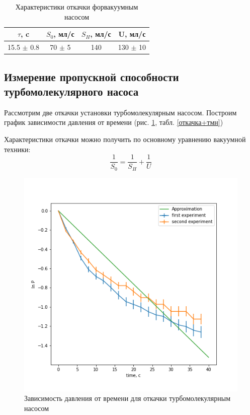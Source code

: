 \documentclass[a4paper,12pt]{article} %
\begin{document}
\begin{table}
\caption{Характеристики откачки форвакуумным насосом}
\label{откачка+форв}
\begin{tabular}{|c|c|c|c|}
\hline 
$\tau$, c & $S_0$, мл/с& $S_H$, мл/с& U, мл/с  \\ 
\hline 
15.5 $\pm$ 0.8 & 70 $\pm$ 5 & 140 & 130 $\pm$ 10\\ 
\hline  
\end{tabular} 
\end{table}


\subsection{Измерение пропускной способности турбомолекулярного насоса}
Рассмотрим две откачки установки турбомолекулярным насосом. Построим график зависимости давления от времени (рис. \ref{турбомолекулярный}, табл. \ref{откачка+тмн})

Характеристики откачки можно получить по основному уравнению вакуумной техники:
\begin{equation}
\frac{1}{S_0} = \frac{1}{S_H}+\frac{1}{U} 
\end{equation}

\begin{figure}[h!]
\begin{center}
\includegraphics[width=\textwidth]{ТМН}
\end{center}
\caption{Зависимость давления от времени для откачки турбомолекулярным насосом} \label{турбомолекулярный}
\end{figure}
\end{document}
